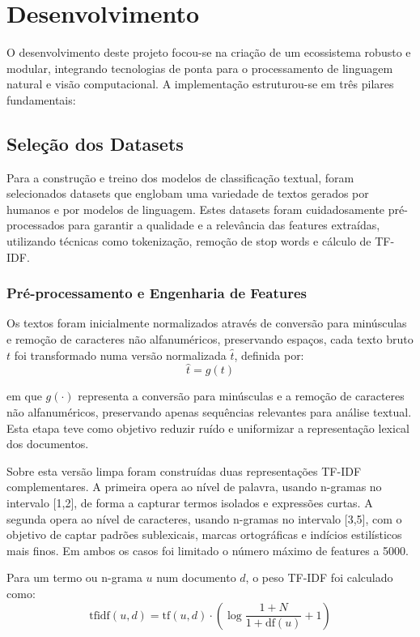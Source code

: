 \documentclass[a4paper,12pt]{scrreprt}
\begin{document}
\chapter{Desenvolvimento}
    O desenvolvimento deste projeto focou-se na criação de um ecossistema robusto e modular, integrando tecnologias de ponta para o processamento de linguagem natural e visão computacional. A implementação estruturou-se em três pilares fundamentais:

    \section{Seleção dos Datasets}
        Para a construção e treino dos modelos de classificação textual, foram selecionados datasets que englobam uma variedade de textos gerados por humanos e por modelos de linguagem. Estes datasets foram cuidadosamente pré-processados para garantir a qualidade e a relevância das features extraídas, utilizando técnicas como tokenização, remoção de stop words e cálculo de TF-IDF.

    \subsection{Pré-processamento e Engenharia de Features}
        Os textos foram inicialmente normalizados através de conversão para minúsculas e remoção de caracteres não alfanuméricos, preservando espaços, cada texto bruto $t$ foi transformado numa versão normalizada $\hat{t}$, definida por:
        \[
        \hat{t} = g(t)
        \]

        em que $g(\cdot)$ representa a conversão para minúsculas e a remoção de caracteres não alfanuméricos, preservando apenas sequências relevantes para análise textual. Esta etapa teve como objetivo reduzir ruído e uniformizar a representação lexical dos documentos.

        Sobre esta versão limpa foram construídas duas representações TF-IDF complementares. A primeira opera ao nível de palavra, usando n-gramas no intervalo [1,2], de forma a capturar termos isolados e expressões curtas. A segunda opera ao nível de caracteres, usando n-gramas no intervalo [3,5], com o objetivo de captar padrões sublexicais, marcas ortográficas e indícios estilísticos mais finos. Em ambos os casos foi limitado o número máximo de features a 5000.

        Para um termo ou n-grama $u$ num documento $d$, o peso TF-IDF foi calculado como:
        \[
        \text{tfidf}(u,d) = \text{tf}(u,d) \cdot \left( \log \frac{1 + N}{1 + \text{df}(u)} + 1 \right)
        \]
\end{document}
